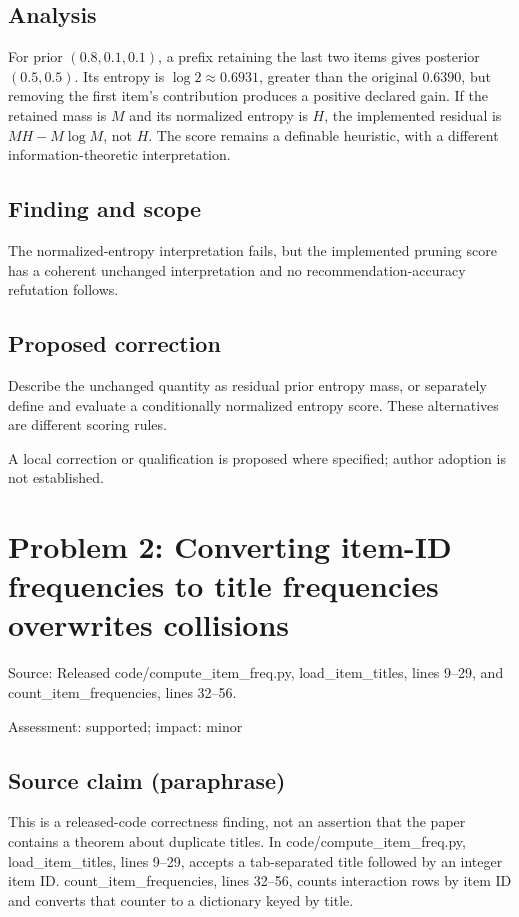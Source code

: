 \documentclass[11pt]{article}
\begin{document}
\subsection*{Analysis}

For prior \((0.8,0.1,0.1)\), a prefix retaining the last two items gives posterior \((0.5,0.5)\). Its entropy is \(\log2\approx0.6931\), greater than the original \(0.6390\), but removing the first item's contribution produces a positive declared gain. If the retained mass is \(M\) and its normalized entropy is \(H\), the implemented residual is \(MH-M\log M\), not \(H\). The score remains a definable heuristic, with a different information-theoretic interpretation.

\subsection*{Finding and scope}

The normalized-entropy interpretation fails, but the implemented pruning score has a coherent unchanged interpretation and no recommendation-accuracy refutation follows.

\subsection*{Proposed correction}

Describe the unchanged quantity as residual prior entropy mass, or separately define and evaluate a conditionally normalized entropy score. These alternatives are different scoring rules.

A local correction or qualification is proposed where specified; author adoption is not established.

\section*{Problem 2: Converting item-ID frequencies to title frequencies overwrites collisions}

Source: Released code/compute\_item\_freq.py, load\_item\_titles, lines 9–29, and count\_item\_frequencies, lines 32–56.

Assessment: supported; impact: minor

\subsection*{Source claim (paraphrase)}

This is a released-code correctness finding, not an assertion that the paper contains a theorem about duplicate titles. In code/compute\_item\_freq.py, load\_item\_titles, lines 9–29, accepts a tab-separated title followed by an integer item ID. count\_item\_frequencies, lines 32–56, counts interaction rows by item ID and converts that counter to a dictionary keyed by title.
\end{document}
